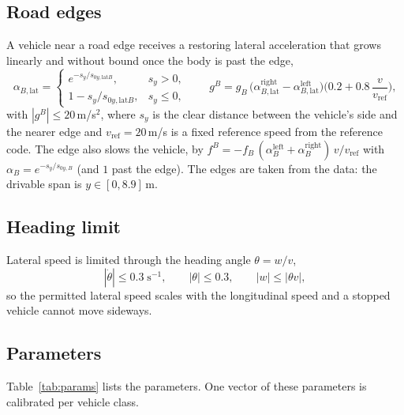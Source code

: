 \documentclass[11pt]{article}
\begin{document}
\subsection{Road edges}
A vehicle near a road edge receives a restoring lateral acceleration that grows
linearly and without bound once the body is past the edge,
\begin{equation}
\alpha_{B,\mathrm{lat}}=\begin{cases}
e^{-s_y/s_{0y,\mathrm{lat}B}}, & s_y>0,\\[3pt]
1-s_y/s_{0y,\mathrm{lat}B}, & s_y\le0,\end{cases}
\qquad
g^{B}=g_B\,\big(\alpha_{B,\mathrm{lat}}^{\mathrm{right}}-\alpha_{B,\mathrm{lat}}^{\mathrm{left}}\big)\Big(0.2+0.8\,\frac{v}{v_{\mathrm{ref}}}\Big),
\label{eq:bnd}
\end{equation}
with $|g^{B}|\le20$\,m/s$^2$, where $s_y$ is the clear distance between the
vehicle's side and the nearer edge and $v_{\mathrm{ref}}=20$\,m/s is a fixed
reference speed from the reference code. The edge also slows the vehicle, by
$f^{B}=-f_B\,(\alpha^{\mathrm{left}}_{B}+\alpha^{\mathrm{right}}_{B})\,v/v_{\mathrm{ref}}$
with $\alpha_B=e^{-s_y/s_{0y,B}}$ (and $1$ past the edge). The edges are taken
from the data: the drivable span is $y\in[0,8.9]$\,m.

\subsection{Heading limit}
Lateral speed is limited through the heading angle $\theta=w/v$,
\begin{equation}
|\dot\theta|\le0.3\;\mathrm{s}^{-1},\qquad|\theta|\le0.3,\qquad|w|\le|\theta v|,
\label{eq:clamp}
\end{equation}
so the permitted lateral speed scales with the longitudinal speed and a
stopped vehicle cannot move sideways.

\subsection{Parameters}
Table~\ref{tab:params} lists the parameters. One vector of these parameters is
calibrated per vehicle class. 
\end{document}
